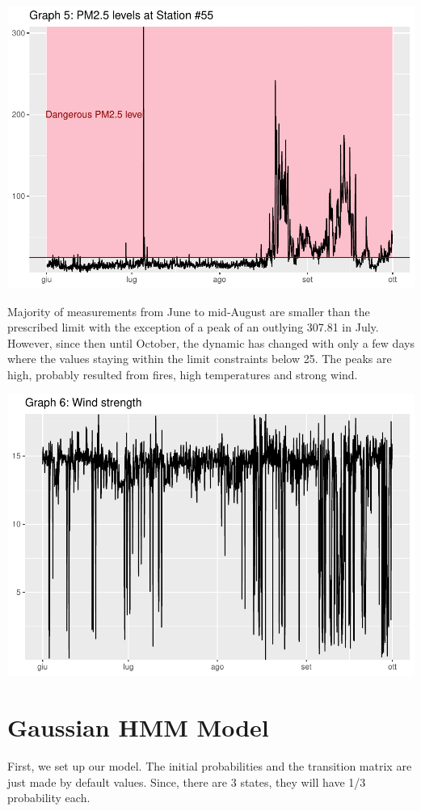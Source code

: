 \documentclass[
]{article}
\begin{document}
\begin{center}\includegraphics[width=0.75\linewidth,height=0.75\textheight]{finalproject_files/figure-latex/PM25 levels-1} \end{center}

Majority of measurements from June to mid-August are smaller than the
prescribed limit with the exception of a peak of an outlying 307.81 in
July. However, since then until October, the dynamic has changed with
only a few days where the values staying within the limit constraints
below 25. The peaks are high, probably resulted from fires, high
temperatures and strong wind.

\begin{center}\includegraphics[width=0.75\linewidth,height=0.75\textheight]{finalproject_files/figure-latex/wind levels-1} \end{center}

\hypertarget{gaussian-hmm-model}{%
\section{Gaussian HMM Model}\label{gaussian-hmm-model}}

First, we set up our model. The initial probabilities and the transition
matrix are just made by default values. Since, there are 3 states, they
will have 1/3 probability each.
\end{document}
